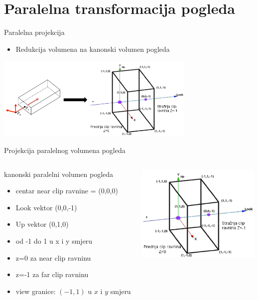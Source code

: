 \documentclass[9pt]{beamer}
\begin{document}
\section{Paralelna transformacija pogleda}

\begin{frame}{Paralelna projekcija}
	
	\begin{itemize}
		\item Redukcija volumena na kanonski volumen pogleda
	\end{itemize}
	\begin{center}
		\includegraphics[height=4cm]{slike/03_canonical_05.png}
	\end{center}
\end{frame}

\begin{frame}{Projekcija paralelnog volumena pogleda}
	\begin{columns}
		\column[t]{6cm}
		\begin{block}{kanonski paralelni volumen pogleda}
			\begin{itemize}
				\item centar near clip ravnine = (0,0,0)
				\item Look vektor (0,0,-1)
				\item Up vektor (0,1,0)
				\item od -1 do 1 u x i y smjeru
				\item z=0  za near clip ravninu
				\item z=-1 za far clip ravninu
				\item view granice: $(-1,1)$ u $x$ i $y$ smjeru
			\end{itemize}
			
		\end{block}
		\column[t]{6cm}
		\begin{center}
			\includegraphics[width=6cm]{slike/03_canonical_02.png}
		\end{center}
	\end{columns}
\end{frame}
\end{document}
